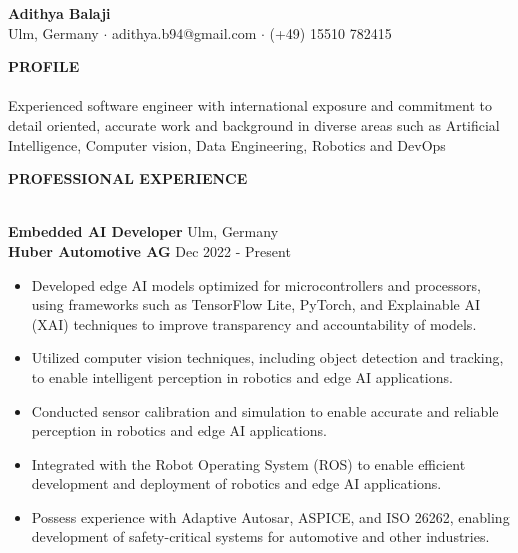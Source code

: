 \documentclass[11pt, a4paper]{article}
\newcommand{\lineunder} {
    \vspace*{-8pt} \\
    \hspace*{-18pt} \hrulefill \\
}
\newcommand{\header} [1] {
    {\hspace*{-18pt}\vspace*{6pt} \textsc{#1}}
    \vspace*{-6pt} \lineunder
}
\begin{document}
\vspace*{-20pt}

    


\begin{center}
	{\Huge {\textbf{Adithya Balaji}}}\\
	Ulm, Germany $\cdot$ adithya.b94@gmail.com $\cdot$ (+49) 15510 782415\\
\end{center}

\vspace{5mm}

\header {\textbf{PROFILE}}
\vspace{1mm}
Experienced software engineer with international exposure and commitment to detail oriented, accurate work and background in diverse areas such as Artificial Intelligence, Computer vision, Data Engineering, Robotics and DevOps 

\vspace{5mm}

\header{\textbf{PROFESSIONAL EXPERIENCE}}
\vspace{1mm}

\textbf{Embedded AI Developer} \hfill Ulm, Germany\\

\textbf{Huber Automotive AG} \hfill Dec 2022 - Present\\
\begin{itemize} \itemsep 1pt
        \item Developed edge AI models optimized for microcontrollers and processors, using frameworks such as TensorFlow Lite, PyTorch, and Explainable AI (XAI) techniques to improve transparency and accountability of models.
        \item Utilized computer vision techniques, including object detection and tracking, to enable intelligent perception in robotics and edge AI applications.
        \item Conducted sensor calibration and simulation to enable accurate and reliable perception in robotics and edge AI applications.
        \item Integrated with the Robot Operating System (ROS) to enable efficient development and deployment of robotics and edge AI applications.
        \item Possess experience with Adaptive Autosar, ASPICE, and ISO 26262, enabling development of safety-critical systems for automotive and other industries.
\end{itemize}
\end{document}
